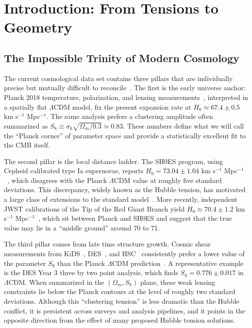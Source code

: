 \documentclass[a4paper,11pt]{article}
\begin{document}
\section{Introduction: From Tensions to Geometry}

\subsection{The Impossible Trinity of Modern Cosmology}

The current cosmological data set contains three pillars that are individually precise but mutually difficult to reconcile~\cite{Kamionkowski_Riess,DiValentino_review}. The first is the early universe anchor: Planck 2018 temperature, polarization, and lensing measurements~\cite{Planck2018,Planck2018_params}, interpreted in a spatially flat $\Lambda$CDM model, fix the present expansion rate at $H_0 \simeq 67.4 \pm 0.5$ km s$^{-1}$ Mpc$^{-1}$. The same analysis prefers a clustering amplitude often summarized as $S_8 \equiv \sigma_8 \sqrt{\Omega_m/0.3} \simeq 0.83$. These numbers define what we will call the ``Planck corner'' of parameter space and provide a statistically excellent fit to the CMB itself.

The second pillar is the local distance ladder. The SH0ES program, using Cepheid calibrated type Ia supernovae, reports $H_0 = 73.04 \pm 1.04$ km s$^{-1}$ Mpc$^{-1}$~\cite{SH0ES}, which disagrees with the Planck $\Lambda$CDM value at roughly five standard deviations. This discrepancy, widely known as the Hubble tension, has motivated a large class of extensions to the standard model~\cite{Knox_Millea}. More recently, independent JWST calibrations of the Tip of the Red Giant Branch yield $H_0 \approx 70.4 \pm 1.2$ km s$^{-1}$ Mpc$^{-1}$~\cite{Freedman2024}, which sit between Planck and SH0ES and suggest that the true value may lie in a ``middle ground'' around 70 to 71.

The third pillar comes from late time structure growth. Cosmic shear measurements from KiDS~\cite{KiDS1000}, DES~\cite{DES_Y3}, and HSC~\cite{HSC_Y3} consistently prefer a lower value of the parameter $S_8$ than the Planck $\Lambda$CDM prediction~\cite{DiValentino_S8}. A representative example is the DES Year 3 three by two point analysis, which finds $S_8 = 0.776 \pm 0.017$ in $\Lambda$CDM. When summarized in the $(\Omega_m, S_8)$ plane, these weak lensing constraints lie below the Planck contours at the level of roughly two standard deviations. Although this ``clustering tension'' is less dramatic than the Hubble conflict, it is persistent across surveys and analysis pipelines, and it points in the opposite direction from the effect of many proposed Hubble tension solutions.
\end{document}
